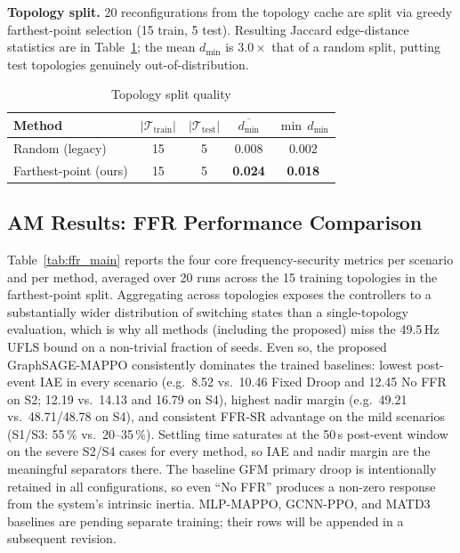 \textbf{Topology split.} 20 reconfigurations from the topology cache are split
via greedy farthest-point selection (15 train, 5 test). Resulting Jaccard
edge-distance statistics are in Table~\ref{tab:split_quality}; the mean
$d_{\min}$ is $3.0\times$ that of a random split, putting test topologies
genuinely out-of-distribution.

\begin{table}[!t]
\caption{Topology split quality}
\label{tab:split_quality}
\centering
\footnotesize
\begin{tabular}{lcccc}
\toprule
Method & $|\mathcal{T}_{\text{train}}|$ & $|\mathcal{T}_{\text{test}}|$ &
$\overline{d_{\min}}$ & $\min\, d_{\min}$ \\
\midrule
Random (legacy)         & 15 & 5 & 0.008 & 0.002 \\
Farthest-point (ours)   & 15 & 5 & \textbf{0.024} & \textbf{0.018} \\
\bottomrule
\end{tabular}
\end{table}

\subsection{AM Results: FFR Performance Comparison}
\label{ssec:results_am}

Table~\ref{tab:ffr_main} reports the four core frequency-security metrics
per scenario and per method, averaged over 20 runs across the 15 training
topologies in the farthest-point split. Aggregating across topologies
exposes the controllers to a substantially wider distribution of
switching states than a single-topology evaluation, which is why all
methods (including the proposed) miss the 49.5\,Hz UFLS bound on a
non-trivial fraction of seeds. Even so, the proposed GraphSAGE-MAPPO
consistently dominates the trained baselines: lowest post-event IAE in
every scenario (e.g.\ 8.52 vs.\ 10.46 Fixed Droop and 12.45 No FFR on
S2; 12.19 vs.\ 14.13 and 16.79 on S4), highest nadir margin (e.g.\ 49.21
vs.\ 48.71/48.78 on S4), and consistent FFR-SR advantage on the mild
scenarios (S1/S3: 55\,\% vs.\ 20--35\,\%). Settling time saturates at the 50\,s
post-event window on the severe S2/S4 cases for every method, so IAE and
nadir margin are the meaningful separators there. The baseline GFM
primary droop is intentionally retained in all configurations, so even
``No FFR'' produces a non-zero response from the system's intrinsic
inertia. MLP-MAPPO, GCNN-PPO, and MATD3 baselines are pending separate
training; their rows will be appended in a subsequent revision.


